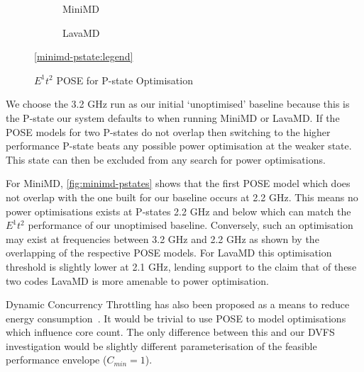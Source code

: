 \begin{figure}[t]%
\begin{subfigure}[t]{.5\linewidth}%
\centering%
%
\caption{MiniMD}%
\label{fig:minimd-pstates}%
\end{subfigure}%
\begin{subfigure}[t]{.5\linewidth}%
%
\caption{LavaMD}%
\label{fig:lavamd-pstates}%
\end{subfigure}%
\begin{center}%
\ref{minimd-pstate:legend}%
\end{center}%
\caption{$E^1t^2$ POSE for P-state Optimisation}%
\label{fig:pstates}%
\end{figure}%

We choose the 3.2 GHz run as our initial `unoptimised' baseline because this is the P-state our system defaults to when running MiniMD or LavaMD.
If the POSE models for two P-states do not overlap then switching to the higher performance P-state beats any possible power optimisation at the weaker state.
This state can then be excluded from any search for power optimisations.

For MiniMD, \autoref{fig:minimd-pstates} shows that the first POSE model which does not overlap with the one built for our baseline occurs at 2.2 GHz.
This means no power optimisations exists at P-states 2.2 GHz and below which can match the $E^1t^2$ performance of our unoptimised baseline.
Conversely, such an optimisation may exist at frequencies between 3.2 GHz and 2.2 GHz as shown by the overlapping of the respective POSE models.
For LavaMD this optimisation threshold is slightly lower at 2.1 GHz, lending support to the claim that of these two codes LavaMD is more amenable to power optimisation.

Dynamic Concurrency Throttling has also been proposed as a means to reduce energy consumption~\cite{maury:2006aa}.
It would be trivial to use POSE to model optimisations which influence core count.
The only difference between this and our DVFS investigation would be slightly different parameterisation of the feasible performance envelope ($C_{min}=1$).
